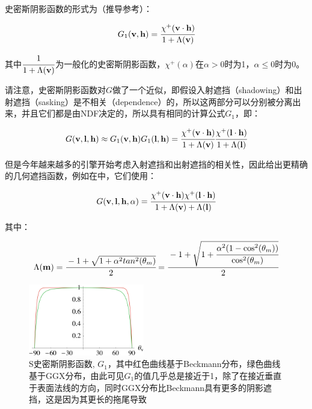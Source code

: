 \begin{shaded}
	史密斯阴影函数的形式为（推导参考\cite{a:UnderstandingtheMaskingShadowingFunctioninMicrofacetBasedBRDFs}）：
	
	\begin{equation}
		G_1(\mathbf{v},\mathbf{h})= \cfrac{\chi^{+}(\mathbf{v}\cdot\mathbf{h})}{1+\Lambda (\mathbf{v})}
	\end{equation}
	
	\noindent 其中$ \cfrac{1}{1+\Lambda (\mathbf{v})}$为一般化的史密斯阴影函数，$\chi^{+}(\alpha)$在$\alpha>0$时为1，$\alpha\leq 0$时为0。
	
	请注意，史密斯阴影函数对$G$做了一个近似，即假设入射遮挡（shadowing）和出射遮挡（sasking）是不相关（dependence）的，所以这两部分可以分别被分离出来，并且它们都是由NDF决定的，所以具有相同的计算公式$G_1$，即：

\begin{equation}\label{eq:intro-smith-shadow-masking}
	G(\mathbf{v,\mathbf{l},\mathbf{h}})\approx G_1(\mathbf{v},\mathbf{h})G_1(\mathbf{l},\mathbf{h})= \cfrac{\chi^{+}(\mathbf{v}\cdot\mathbf{h})}{1+\Lambda (\mathbf{v})} \cfrac{\chi^{+}(\mathbf{l}\cdot\mathbf{h})}{1+\Lambda (\mathbf{l})}
\end{equation}

但是今年越来越多的引擎开始考虑入射遮挡和出射遮挡的相关性，因此给出更精确的几何遮挡函数，例如在\cite{a:MovingFrostbitetoPBR}中，它们使用：

	\begin{equation}\label{eq:intro-correct-shadow-masking}
		G(\mathbf{v},\mathbf{l},\mathbf{h},\alpha)= \cfrac{\chi^{+}(\mathbf{v}\cdot\mathbf{h})\chi^{+}(\mathbf{l}\cdot\mathbf{h})}{1+\Lambda (\mathbf{v})+\Lambda (\mathbf{l})}
	\end{equation}

\noindent 其中：

\begin{equation}
	\Lambda (\mathbf{m})= \cfrac{-1+\sqrt{1+\alpha^2 tan^2 (\theta_m)}}{2}= \cfrac{-1+\sqrt{1+ \cfrac{\alpha^2 (1-\cos^2 (\theta_m))}{\cos^2 (\theta_m)}}}{2}
\end{equation}


\end{shaded}


\begin{figure}
	\sidecaption
	\includegraphics[width=0.45\textwidth]{figures/intro/smith-shadowing-masking}
	\caption{S史密斯阴影函数, $G_1$，其中红色曲线基于Beckmann分布，绿色曲线基于GGX分布，由此可见$G_1$的值几乎总是接近于1，除了在接近垂直于表面法线的方向，同时GGX分布比Beckmann具有更多的阴影遮挡，这是因为其更长的拖尾导致}
	\label{f:intro-smith-shadowing-masking}
\end{figure}




